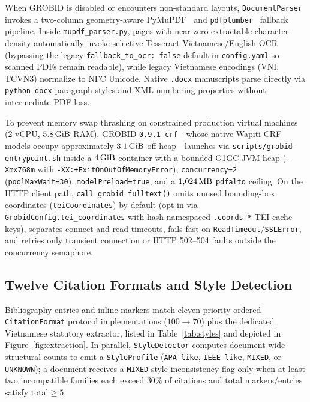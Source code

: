 When GROBID is disabled or encounters non-standard layouts, \texttt{Document\allowbreak Parser} invokes a two-column geometry-aware PyMuPDF~\cite{PyMuPDF2024} and \texttt{pdfplumber}~\cite{Pdfplumber2024} fallback pipeline. Inside \texttt{mupdf\_parser.py}, pages with near-zero extractable character density automatically invoke selective Tesseract Vietnamese/English OCR (bypassing the legacy \texttt{fallback\_to\_ocr: false} default in \texttt{config.yaml} so scanned PDFs remain readable), while legacy Vietnamese encodings (VNI, TCVN3) normalize to NFC Unicode. Native \texttt{.docx} manuscripts parse directly via \texttt{python-docx} paragraph styles and XML numbering properties without intermediate PDF loss.

To prevent memory swap thrashing on constrained production virtual machines (2 vCPU, $5.8\text{\,GiB}$ RAM), GROBID \texttt{0.9.1-crf}---whose native Wapiti CRF models occupy approximately $3.1\text{\,GiB}$ off-heap---launches via \texttt{scripts/\allowbreak{}grobid-entrypoint.sh} inside a $4\text{\,GiB}$ container with a bounded G1GC JVM heap (\texttt{-Xmx768m} with \texttt{-XX:+ExitOnOutOfMemoryError}), \texttt{concurrency=2} (\texttt{poolMaxWait=30}), \texttt{modelPreload=true}, and a $1{,}024\text{\,MB}$ \texttt{pdfalto} ceiling. On the HTTP client path, \texttt{call\_grobid\_fulltext()} omits unused bounding-box coordinates (\texttt{teiCoordinates}) by default (opt-in via \texttt{GrobidConfig.tei\_coordinates} with hash-namespaced \texttt{.coords-*} TEI cache keys), separates connect and read timeouts, fails fast on \texttt{ReadTimeout}/\texttt{SSLError}, and retries only transient connection or HTTP 502--504 faults outside the concurrency semaphore.

\subsection{Twelve Citation Formats and Style Detection}

Bibliography entries and inline markers match eleven priority-ordered \texttt{CitationFormat} protocol implementations ($100 \rightarrow 70$) plus the dedicated Vietnamese statutory extractor, listed in Table~\ref{tab:styles} and depicted in Figure~\ref{fig:extraction}. In parallel, \texttt{StyleDetector} computes document-wide structural counts to emit a \texttt{StyleProfile} (\texttt{APA-like}, \texttt{IEEE-like}, \texttt{MIXED}, or \texttt{UNKNOWN}); a document receives a \texttt{MIXED} style-inconsistency flag only when at least two incompatible families each exceed $30\%$ of citations and total markers/entries satisfy $\text{total} \ge 5$.

